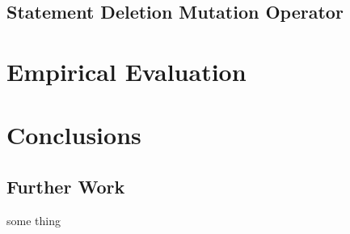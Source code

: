 \documentclass{article}
\begin{document}
\subsection{Statement Deletion Mutation Operator}

\section{Empirical Evaluation}

\section{Conclusions}

\subsection{Further Work}
some thing

\begin{appendices}
\end{appendices}


\end{document}
